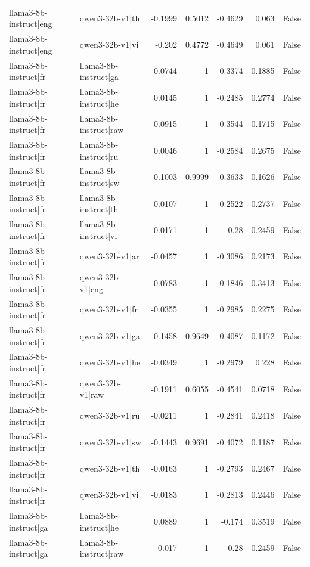\begin{table}
\begin{tabular}{l l r r r r l}
llama3-8b-instruct|eng & qwen3-32b-v1|th & -0.1999 & 0.5012 & -0.4629 & 0.063 & False \\
llama3-8b-instruct|eng & qwen3-32b-v1|vi & -0.202 & 0.4772 & -0.4649 & 0.061 & False \\
llama3-8b-instruct|fr & llama3-8b-instruct|ga & -0.0744 & 1 & -0.3374 & 0.1885 & False \\
llama3-8b-instruct|fr & llama3-8b-instruct|he & 0.0145 & 1 & -0.2485 & 0.2774 & False \\
llama3-8b-instruct|fr & llama3-8b-instruct|raw & -0.0915 & 1 & -0.3544 & 0.1715 & False \\
llama3-8b-instruct|fr & llama3-8b-instruct|ru & 0.0046 & 1 & -0.2584 & 0.2675 & False \\
llama3-8b-instruct|fr & llama3-8b-instruct|sw & -0.1003 & 0.9999 & -0.3633 & 0.1626 & False \\
llama3-8b-instruct|fr & llama3-8b-instruct|th & 0.0107 & 1 & -0.2522 & 0.2737 & False \\
llama3-8b-instruct|fr & llama3-8b-instruct|vi & -0.0171 & 1 & -0.28 & 0.2459 & False \\
llama3-8b-instruct|fr & qwen3-32b-v1|ar & -0.0457 & 1 & -0.3086 & 0.2173 & False \\
llama3-8b-instruct|fr & qwen3-32b-v1|eng & 0.0783 & 1 & -0.1846 & 0.3413 & False \\
llama3-8b-instruct|fr & qwen3-32b-v1|fr & -0.0355 & 1 & -0.2985 & 0.2275 & False \\
llama3-8b-instruct|fr & qwen3-32b-v1|ga & -0.1458 & 0.9649 & -0.4087 & 0.1172 & False \\
llama3-8b-instruct|fr & qwen3-32b-v1|he & -0.0349 & 1 & -0.2979 & 0.228 & False \\
llama3-8b-instruct|fr & qwen3-32b-v1|raw & -0.1911 & 0.6055 & -0.4541 & 0.0718 & False \\
llama3-8b-instruct|fr & qwen3-32b-v1|ru & -0.0211 & 1 & -0.2841 & 0.2418 & False \\
llama3-8b-instruct|fr & qwen3-32b-v1|sw & -0.1443 & 0.9691 & -0.4072 & 0.1187 & False \\
llama3-8b-instruct|fr & qwen3-32b-v1|th & -0.0163 & 1 & -0.2793 & 0.2467 & False \\
llama3-8b-instruct|fr & qwen3-32b-v1|vi & -0.0183 & 1 & -0.2813 & 0.2446 & False \\
llama3-8b-instruct|ga & llama3-8b-instruct|he & 0.0889 & 1 & -0.174 & 0.3519 & False \\
llama3-8b-instruct|ga & llama3-8b-instruct|raw & -0.017 & 1 & -0.28 & 0.2459 & False \\

\end{tabular}
\end{table}
